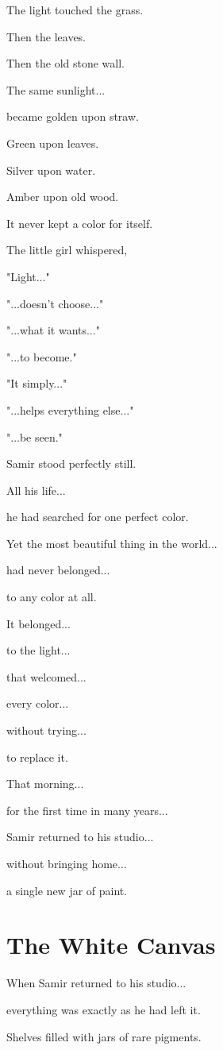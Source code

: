 \documentclass[12pt,openany]{book}
\begin{document}
The light touched the grass.

Then the leaves.

Then the old stone wall.

The same sunlight...

became golden upon straw.

Green upon leaves.

Silver upon water.

Amber upon old wood.

It never kept a color for itself.

The little girl whispered,

"Light..."

"...doesn't choose..."

"...what it wants..."

"...to become."

"It simply..."

"...helps everything else..."

"...be seen."

Samir stood perfectly still.

All his life...

he had searched for one perfect color.

Yet the most beautiful thing in the world...

had never belonged...

to any color at all.

It belonged...

to the light...

that welcomed...

every color...

without trying...

to replace it.

That morning...

for the first time in many years...

Samir returned to his studio...

without bringing home...

a single new jar of paint.
\section*{The White Canvas}

When Samir returned to his studio...

everything was exactly as he had left it.

Shelves filled with jars of rare pigments.
\end{document}
